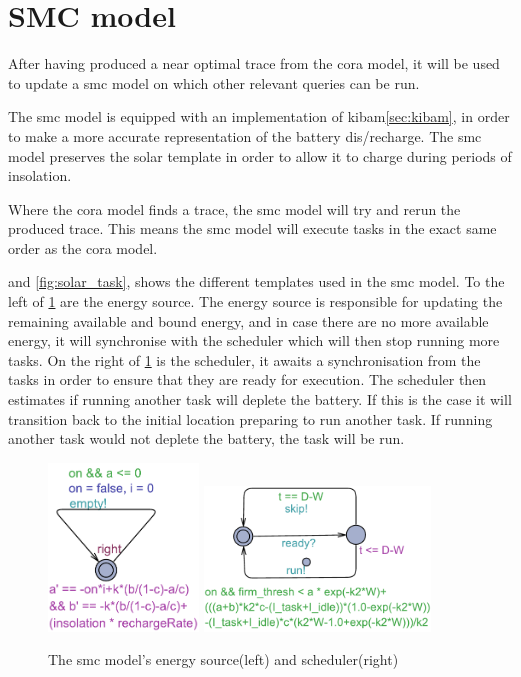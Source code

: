 \section{SMC model} \label{sec:smc}
After having produced a near optimal trace from the \gls{cora} model, it will be used to update a \gls{smc} model on which other relevant queries can be run.

The \gls{smc} model is equipped with an implementation of \gls{kibam}\cref{sec:kibam}, in order to make a more accurate representation of the battery dis/recharge. The \gls{smc} model preserves the solar template in order to allow it to charge during periods of insolation.

Where the \gls{cora} model finds a trace, the \gls{smc} model will try and rerun the produced trace. This means the \gls{smc} model will execute tasks in the exact same order as the \gls{cora} model.%

 and \cref{fig:solar_task}, shows the different templates used in the \gls{smc} model. To the left of \cref{fig:cost_schedule} are the energy source. The energy source is responsible for updating the remaining available and bound energy, and in case there are no more available energy, it will synchronise with the scheduler which will then stop running more tasks.
On the right of \cref{fig:cost_schedule} is the scheduler, it awaits a synchronisation from the tasks in order to ensure that they are ready for execution. The scheduler then estimates if running another task will deplete the battery. If this is the case it will transition back to the initial location preparing to run another task. If running another task would not deplete the battery, the task will be run.

\begin{figure}[H]%
	\centering
	\subfloat
	{{\includegraphics[width=4cm]{graphics/smc_costhandler.pdf} }}%
	\qquad
	\subfloat
	{{\includegraphics[width=6cm]{graphics/smc_scheduler.pdf} }}%
	\caption{The \gls{smc} model's energy source(left) and scheduler(right)}%
	\label{fig:cost_schedule}%
\end{figure}

